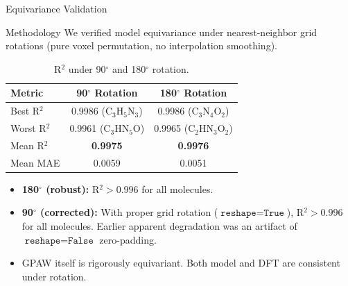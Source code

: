 \documentclass[aspectratio=169]{beamer}
\begin{document}
\begin{frame}{Equivariance Validation}
  \begin{block}{Methodology}
    We verified model equivariance under nearest-neighbor grid rotations (pure voxel permutation, no interpolation smoothing).
  \end{block}

  \begin{table}[h]
    \centering
    \scriptsize
    \caption{R$^2$ under 90$^\circ$ and 180$^\circ$ rotation.}
    \begin{tabular}{lcc}
    \toprule
    Metric & 90$^\circ$ Rotation & 180$^\circ$ Rotation \\
    \midrule
    Best R$^2$ & 0.9986 (C$_3$H$_5$N$_3$) & 0.9986 (C$_3$N$_4$O$_2$) \\
    Worst R$^2$ & 0.9961 (C$_3$HN$_5$O) & 0.9965 (C$_2$HN$_3$O$_2$) \\
    Mean R$^2$ & \textbf{0.9975} & \textbf{0.9976} \\
    Mean MAE & 0.0059 & 0.0051 \\
    \bottomrule
    \end{tabular}
  \end{table}

  \footnotesize
  \begin{itemize}
      \item \textbf{180$^\circ$ (robust):} R$^2 > 0.996$ for all molecules.
      \item \textbf{90$^\circ$ (corrected):} With proper grid rotation ($\texttt{reshape}=\texttt{True}$), R$^2 > 0.996$ for all molecules. Earlier apparent degradation was an artifact of $\texttt{reshape}=\texttt{False}$ zero-padding.
      \item GPAW itself is rigorously equivariant. Both model and DFT are consistent under rotation.
  \end{itemize}
\end{frame}
\end{document}

